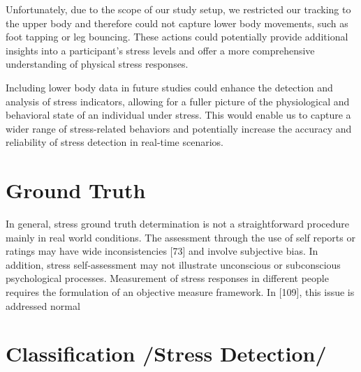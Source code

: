 Unfortunately, due to the scope of our study setup, we restricted our tracking to the upper body and therefore could not capture lower body movements, such as foot tapping or leg bouncing. These actions could potentially provide additional insights into a participant's stress levels and offer a more comprehensive understanding of physical stress responses.

Including lower body data in future studies could enhance the detection and analysis of stress indicators, allowing for a fuller picture of the physiological and behavioral state of an individual under stress. This would enable us to capture a wider range of stress-related behaviors and potentially increase the accuracy and reliability of stress detection in real-time scenarios.


\section{Ground Truth}
In general, stress ground truth determination is not a straightforward procedure mainly in real world conditions. The assessment through the use of self reports or ratings may have wide inconsistencies [73] and involve subjective bias. In addition, stress self-assessment may not illustrate unconscious or subconscious psychological processes. Measurement of stress responses in different people requires the formulation of an objective measure framework. In [109], this issue is addressed normal


\section{Classification /Stress Detection/}
